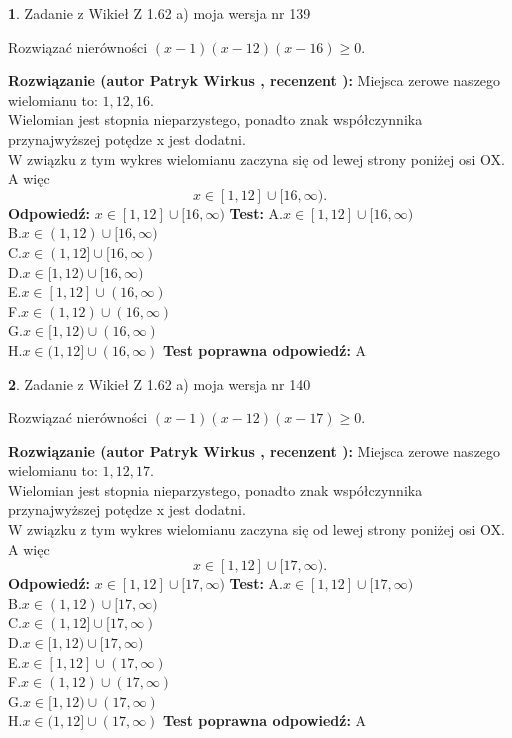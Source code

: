 \documentclass[12pt, a4paper]{article}
\theoremstyle{definition} %
\newtheorem{zad}{}
\newcommand{\zadStart}[1]{\begin{zad}#1\newline}
\newcommand{\zadStop}{\end{zad}}
\newcommand{\rozwStart}[2]{\noindent \textbf{Rozwiązanie (autor #1 , recenzent #2): }\newline}
\newcommand{\rozwStop}{\newline}
\newcommand{\odpStart}{\noindent \textbf{Odpowiedź:}\newline}
\newcommand{\odpStop}{\newline}
\newcommand{\testStart}{\noindent \textbf{Test:}\newline}
\newcommand{\testStop}{\newline}
\newcommand{\kluczStart}{\noindent \textbf{Test poprawna odpowiedź:}\newline}
\newcommand{\kluczStop}{\newline}
\begin{document}
\zadStart{Zadanie z Wikieł Z 1.62 a) moja wersja nr 139}

Rozwiązać nierówności $(x-1)(x-12)(x-16)\ge0$.
\zadStop
\rozwStart{Patryk Wirkus}{}
Miejsca zerowe naszego wielomianu to: $1, 12, 16$.\\
Wielomian jest stopnia nieparzystego, ponadto znak współczynnika przy\linebreak najwyższej potędze x jest dodatni.\\ W związku z tym wykres wielomianu zaczyna się od lewej strony poniżej osi OX. A więc $$x \in [1,12] \cup [16,\infty).$$
\rozwStop
\odpStart
$x \in [1,12] \cup [16,\infty)$
\odpStop
\testStart
A.$x \in [1,12] \cup [16,\infty)$\\
B.$x \in (1,12) \cup [16,\infty)$\\
C.$x \in (1,12] \cup [16,\infty)$\\
D.$x \in [1,12) \cup [16,\infty)$\\
E.$x \in [1,12] \cup (16,\infty)$\\
F.$x \in (1,12) \cup (16,\infty)$\\
G.$x \in [1,12) \cup (16,\infty)$\\
H.$x \in (1,12] \cup (16,\infty)$
\testStop
\kluczStart
A
\kluczStop



\zadStart{Zadanie z Wikieł Z 1.62 a) moja wersja nr 140}

Rozwiązać nierówności $(x-1)(x-12)(x-17)\ge0$.
\zadStop
\rozwStart{Patryk Wirkus}{}
Miejsca zerowe naszego wielomianu to: $1, 12, 17$.\\
Wielomian jest stopnia nieparzystego, ponadto znak współczynnika przy\linebreak najwyższej potędze x jest dodatni.\\ W związku z tym wykres wielomianu zaczyna się od lewej strony poniżej osi OX. A więc $$x \in [1,12] \cup [17,\infty).$$
\rozwStop
\odpStart
$x \in [1,12] \cup [17,\infty)$
\odpStop
\testStart
A.$x \in [1,12] \cup [17,\infty)$\\
B.$x \in (1,12) \cup [17,\infty)$\\
C.$x \in (1,12] \cup [17,\infty)$\\
D.$x \in [1,12) \cup [17,\infty)$\\
E.$x \in [1,12] \cup (17,\infty)$\\
F.$x \in (1,12) \cup (17,\infty)$\\
G.$x \in [1,12) \cup (17,\infty)$\\
H.$x \in (1,12] \cup (17,\infty)$
\testStop
\kluczStart
A
\kluczStop
\end{document}
